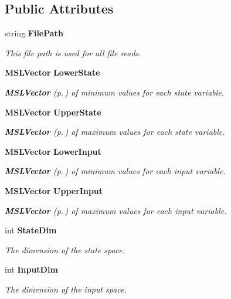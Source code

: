 \subsection*{Public Attributes}
\begin{CompactItemize}
\item 
string {\bf File\-Path}
\begin{CompactList}\small\item\em This file path is used for all file reads.\item\end{CompactList}\item 
{\bf MSLVector} {\bf Lower\-State}
\begin{CompactList}\small\item\em {\bf MSLVector} {\rm (p.\,\pageref{classMSLVector})} of minimum values for each state variable.\item\end{CompactList}\item 
{\bf MSLVector} {\bf Upper\-State}
\begin{CompactList}\small\item\em {\bf MSLVector} {\rm (p.\,\pageref{classMSLVector})} of maximum values for each state variable.\item\end{CompactList}\item 
{\bf MSLVector} {\bf Lower\-Input}
\begin{CompactList}\small\item\em {\bf MSLVector} {\rm (p.\,\pageref{classMSLVector})} of minimum values for each input variable.\item\end{CompactList}\item 
{\bf MSLVector} {\bf Upper\-Input}
\begin{CompactList}\small\item\em {\bf MSLVector} {\rm (p.\,\pageref{classMSLVector})} of maximum values for each input variable.\item\end{CompactList}\item 
int {\bf State\-Dim}
\begin{CompactList}\small\item\em The dimension of the state space.\item\end{CompactList}\item 
int {\bf Input\-Dim}
\begin{CompactList}\small\item\em The dimension of the input space.\item\end{CompactList}\end{CompactItemize}
